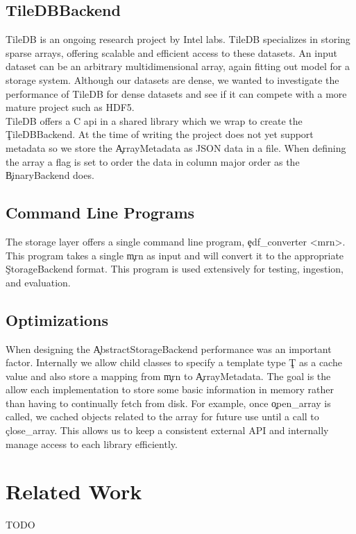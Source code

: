 \subsection{TileDBBackend}

TileDB\cite{tiledb} is an ongoing research project by Intel labs. TileDB
specializes in storing sparse arrays, offering scalable and efficient access to
these datasets. An input dataset can be an arbitrary multidimensional array,
again fitting out model for a storage system. Although our datasets are dense,
we wanted to investigate the performance of TileDB for dense datasets and see
if it can compete with a more mature project such as HDF5.\\

TileDB offers a C api in a shared library which we wrap to create the
\c{TileDBBackend}. At the time of writing the project does not yet support
metadata so we store the \c{ArrayMetadata} as JSON data in a file. When
defining the array a flag is set to order the data in column major order as the
\c{BinaryBackend} does.

\subsection{Command Line Programs}\label{storage-ch:implementation-cmd}

The storage layer offers a single command line program,
\c{edf\_converter <mrn>}.  This program takes a single \c{mrn} as input
and will convert it to the appropriate \c{StorageBackend} format. This
program is used extensively for testing, ingestion, and evaluation.

\subsection{Optimizations}\label{storage-ch:opt}

When designing the \c{AbstractStorageBackend} performance was an important
factor. Internally we allow child classes to specify a template type \c{T} as
a cache value and also store a mapping from \c{mrn} to \c{ArrayMetadata}. The
goal is the allow each implementation to store some basic information in memory
rather than having to continually fetch from disk. For example, once
\c{open\_array} is called, we cached objects related to the array for future
use until a call to \c{close\_array}. This allows us to keep a consistent
external API and internally manage access to each library efficiently.

\section{Related Work}
TODO

